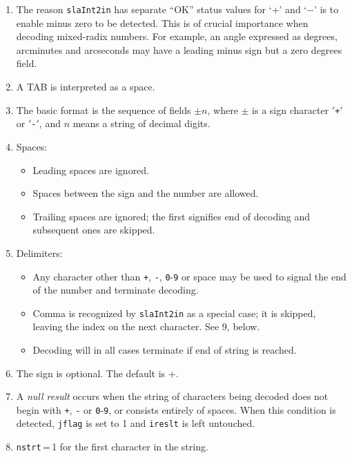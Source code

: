 \documentclass[11pt,fleqn,twoside]{article}
\renewcommand{\_}{{\tt\char'137}}     %
\newcommand{\fstring}[1]{\hspace{0.05em}\mbox{$'${\tt#1}\hspace{0.09em}$'$}}
\begin{document}
{
 \begin{enumerate}
 \item The reason {\tt slaInt2in} has separate ``OK'' status values
       for `+' and `$-$'
       is to enable minus zero to be detected.
       This is of crucial importance
       when decoding mixed-radix numbers.  For example, an angle
       expressed as degrees, arcminutes and arcseconds may have a
       leading minus sign but a zero degrees field.
 \item A TAB is interpreted as a space.
 \item The basic format is the sequence of fields $\pm n$,
       where $\pm$ is a sign
       character \fstring{+} or \fstring{-}, and $n$ means a string of decimal digits.
 \item Spaces:
       \begin{itemize}
       \item Leading spaces are ignored.
       \item Spaces between the sign and the number are allowed.
       \item Trailing spaces are ignored;  the first signifies
             end of decoding and subsequent ones are skipped.
       \end{itemize}
 \item Delimiters:
       \begin{itemize}
       \item Any character other than
             {\tt +},
             {\tt -},
             {\tt 0}-{\tt 9} or
             space may be
             used to signal the end of the number and terminate decoding.
       \item Comma is recognized by {\tt slaInt2in} as a special case; it
             is skipped, leaving the index on the next character.  See
             9, below.
       \item Decoding will in all cases terminate if end of string
             is reached.
       \end{itemize}
 \item The sign is optional.  The default is +.
 \item A {\it null result}\/ occurs when the string of characters
       being decoded does not begin with
       {\tt +},
       {\tt -} or
       {\tt 0}-{\tt 9}, or
       consists entirely of spaces.  When this condition is
       detected, {\tt jflag} is set to 1 and
       {\tt ireslt} is left untouched.
 \item {\tt nstrt}\,=\,1 for the first character in the string.

\end{enumerate}}
\end{document}
